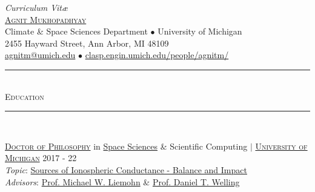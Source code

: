 \documentclass[10pt]{article}
\begin{document}
\thispagestyle{plain}

\begin{center}
{\textit{Curriculum Vit\ae}}\\ \vspace{0.5em}
\href{http://clasp.engin.umich.edu/people/agnitm/}{\Huge\textsc{\lsstyle Agnit Mukhopadhyay}}\\ %
Climate \& Space Sciences Department $\bullet$ University of Michigan\\
2455 Hayward Street, Ann Arbor, MI 48109\\
\href{mailto:agnitm@umich.edu}{agnitm@umich.edu} $\bullet$
\href{https://clasp.engin.umich.edu/people/agnitm/}{clasp.engin.umich.edu/people/agnitm/}
\end{center}
\vspace{-1.75em}



\begin{center}
{\noindent\rule[0.5ex]{\linewidth}{0.5pt}\\
\vspace{-0.5em} \large{\textsc{Education}} \\
\vspace{-0.25em} \noindent\rule[0.5ex]{\linewidth}{0.5pt}}\\
\end{center}
\vspace{-1em}

\href{http://clasp.engin.umich.edu/academics/graduate/doctoral}{\textsc{Doctor of Philosophy}} in \href{http://clasp.engin.umich.edu/}{Space Sciences} \& Scientific Computing
$|$ \textsc{{\href{http://umich.edu/}{{University of Michigan}}}} \hfill {2017 - 22}\\
\emph{Topic}: \href{http://clasp.engin.umich.edu/research/space/MITPhysics}
{Sources of Ionospheric Conductance - Balance and Impact}\\
\emph{Advisors}: \href{http://clasp.engin.umich.edu/people/liemohn/FACULTY}{Prof. Michael W. Liemohn} \& \href{https://www.uta.edu/physics/faculty/welling-daniel.php}{Prof. Daniel T. Welling}\\
\end{document}
